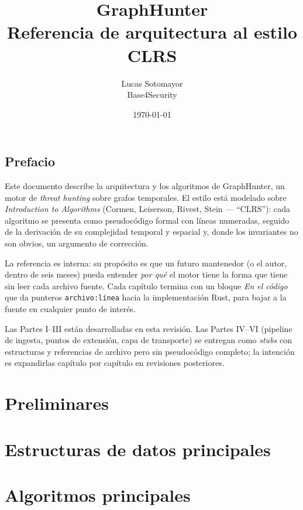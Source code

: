 \documentclass[11pt,openany]{book}
\title{\Huge GraphHunter\\
    \Large Referencia de arquitectura al estilo CLRS}
\author{Lucas Sotomayor \\ \small Base4Security}
\date{\today}
\begin{document}
\frontmatter
\maketitle

\tableofcontents

\chapter*{Prefacio}

Este documento describe la arquitectura y los algoritmos de
GraphHunter, un motor de \emph{threat hunting} sobre grafos
temporales. El estilo está modelado sobre \emph{Introduction to
Algorithms} (Cormen, Leiserson, Rivest, Stein --- ``CLRS''): cada
algoritmo se presenta como pseudocódigo formal con líneas numeradas,
seguido de la derivación de su complejidad temporal y espacial y,
donde los invariantes no son obvios, un argumento de corrección.

La referencia es interna: su propósito es que un futuro mantenedor
(o el autor, dentro de seis meses) pueda entender \emph{por qué} el
motor tiene la forma que tiene sin leer cada archivo fuente. Cada
capítulo termina con un bloque \emph{En el código} que da punteros
\texttt{archivo:línea} hacia la implementación Rust, para bajar a la
fuente en cualquier punto de interés.

Las Partes I--III están desarrolladas en esta revisión. Las Partes
IV--VI (pipeline de ingesta, puntos de extensión, capa de
transporte) se entregan como \emph{stubs} con estructuras y
referencias de archivo pero sin pseudocódigo completo; la intención
es expandirlas capítulo por capítulo en revisiones posteriores.

\mainmatter

\part{Preliminares}



\part{Estructuras de datos principales}







\part{Algoritmos principales}







\end{document}
